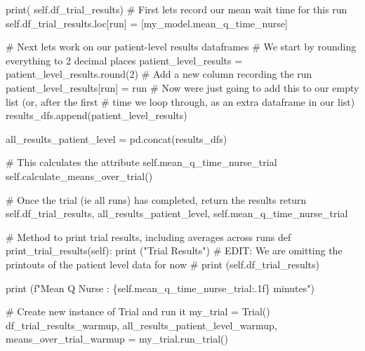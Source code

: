 \documentclass[
  letterpaper,
  DIV=11,
  numbers=noendperiod]{scrreprt}
\newenvironment{Shaded}{}{}
\newcommand{\BuiltInTok}[1]{\textcolor[rgb]{0.84,0.23,0.29}{#1}}
\newcommand{\CommentTok}[1]{\textcolor[rgb]{0.42,0.45,0.49}{#1}}
\newcommand{\ControlFlowTok}[1]{\textcolor[rgb]{0.84,0.23,0.29}{#1}}
\newcommand{\DecValTok}[1]{\textcolor[rgb]{0.00,0.36,0.77}{#1}}
\newcommand{\KeywordTok}[1]{\textcolor[rgb]{0.84,0.23,0.29}{#1}}
\newcommand{\NormalTok}[1]{\textcolor[rgb]{0.14,0.16,0.18}{#1}}
\newcommand{\OperatorTok}[1]{\textcolor[rgb]{0.14,0.16,0.18}{#1}}
\newcommand{\SpecialCharTok}[1]{\textcolor[rgb]{0.00,0.36,0.77}{#1}}
\newcommand{\SpecialStringTok}[1]{\textcolor[rgb]{0.01,0.18,0.38}{#1}}
\newcommand{\StringTok}[1]{\textcolor[rgb]{0.01,0.18,0.38}{#1}}
\newcommand{\VariableTok}[1]{\textcolor[rgb]{0.89,0.38,0.04}{#1}}
\begin{document}
\begin{Shaded}
\begin{Highlighting}[]
            \BuiltInTok{print}\NormalTok{( }\VariableTok{self}\NormalTok{.df\_trial\_results)}
            \CommentTok{\# First let\textquotesingle{}s record our mean wait time for this run}
            \VariableTok{self}\NormalTok{.df\_trial\_results.loc[run] }\OperatorTok{=}\NormalTok{ [my\_model.mean\_q\_time\_nurse]}

            \CommentTok{\# Next let\textquotesingle{}s work on our patient{-}level results dataframes}
            \CommentTok{\# We start by rounding everything to 2 decimal places}
\NormalTok{            patient\_level\_results }\OperatorTok{=}\NormalTok{ patient\_level\_results.}\BuiltInTok{round}\NormalTok{(}\DecValTok{2}\NormalTok{)}
            \CommentTok{\# Add a new column recording the run}
\NormalTok{            patient\_level\_results[}\StringTok{\textquotesingle{}run\textquotesingle{}}\NormalTok{] }\OperatorTok{=}\NormalTok{ run}
            \CommentTok{\# Now we\textquotesingle{}re just going to add this to our empty list (or, after the first}
            \CommentTok{\# time we loop through, as an extra dataframe in our list)}
\NormalTok{            results\_dfs.append(patient\_level\_results)}

\NormalTok{        all\_results\_patient\_level }\OperatorTok{=}\NormalTok{ pd.concat(results\_dfs)}

        \CommentTok{\# This calculates the attribute self.mean\_q\_time\_nurse\_trial}
        \VariableTok{self}\NormalTok{.calculate\_means\_over\_trial()}

        \CommentTok{\# Once the trial (ie all runs) has completed, return the results}
        \ControlFlowTok{return} \VariableTok{self}\NormalTok{.df\_trial\_results, all\_results\_patient\_level, }\VariableTok{self}\NormalTok{.mean\_q\_time\_nurse\_trial}

    \CommentTok{\# Method to print trial results, including averages across runs}
    \KeywordTok{def}\NormalTok{ print\_trial\_results(}\VariableTok{self}\NormalTok{):}
        \BuiltInTok{print}\NormalTok{ (}\StringTok{"Trial Results"}\NormalTok{)}
        \CommentTok{\# EDIT: We are omitting the printouts of the patient level data for now}
        \CommentTok{\# print (self.df\_trial\_results)}

        \BuiltInTok{print}\NormalTok{ (}\SpecialStringTok{f"Mean Q Nurse : }\SpecialCharTok{\{}\VariableTok{self}\SpecialCharTok{.}\NormalTok{mean\_q\_time\_nurse\_trial}\SpecialCharTok{:.1f\}}\SpecialStringTok{ minutes"}\NormalTok{)}

\CommentTok{\# Create new instance of Trial and run it}
\NormalTok{my\_trial }\OperatorTok{=}\NormalTok{ Trial()}
\NormalTok{df\_trial\_results\_warmup, all\_results\_patient\_level\_warmup, means\_over\_trial\_warmup }\OperatorTok{=}\NormalTok{ my\_trial.run\_trial()}
\end{Highlighting}
\end{Shaded}
\end{document}
